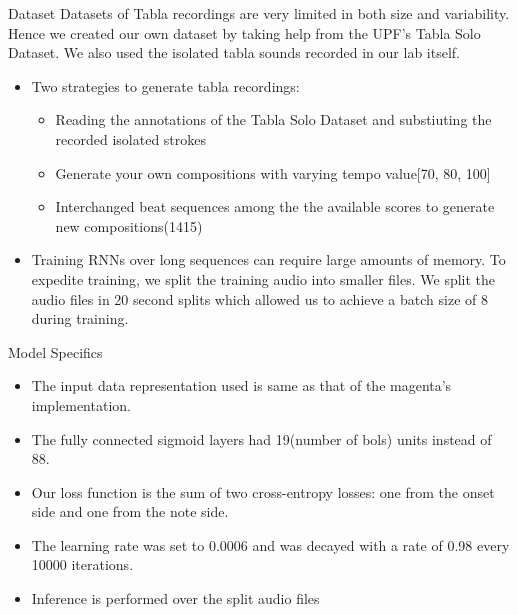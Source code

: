 




\begin{frame}[t,fragile]{Dataset}
Datasets of Tabla recordings are very limited in both size and variability. Hence we created our own dataset by taking help from the UPF's Tabla Solo Dataset. We also used the isolated tabla sounds recorded in our lab itself.  

\begin{itemize}
\item Two strategies to generate tabla recordings:
  \begin{itemize}
  \item Reading the annotations of the Tabla Solo Dataset and substiuting the recorded isolated strokes
  \item Generate your own compositions with varying tempo value[70, 80, 100]
  \item Interchanged beat sequences among the the available scores to generate new compositions(1415)
  \end{itemize}
\item Training RNNs over long sequences can require large amounts of memory. To expedite training, we split the training audio into smaller files. We split the audio files in 20 second splits which allowed us to achieve a batch size of 8 during training.
\end{itemize}
\end{frame}

\begin{frame}[t,fragile]{Model Specifics}
\begin{itemize}

\item The input data representation used is same as that of the magenta's implementation.

\item The fully connected sigmoid layers had 19(number of bols) units instead of 88.

\item Our loss function is the sum of two cross-entropy losses: one from the onset side and one from the note side.

\item The learning rate was set to $0.0006$ and was decayed with a rate of 0.98 every 10000 iterations.

\item Inference is performed over the split audio files
\end{itemize}
\end{frame}


